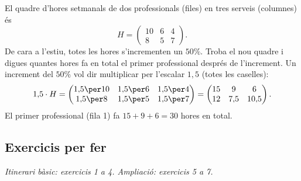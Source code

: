 \begin{exresolt}
El quadre d'hores setmanals de dos professionals (files) en tres serveis
(columnes) és
\[
H=\begin{pmatrix} 10 & 6 & 4 \\ 8 & 5 & 7 \end{pmatrix}.
\]
De cara a l'estiu, totes les hores s'incrementen un $50\%$. Troba el nou quadre
i digues quantes hores fa en total el primer professional després de l'increment.
\solucio
Un increment del $50\%$ vol dir multiplicar per l'escalar $1{,}5$ (totes les
caselles):
\[
1{,}5\cdot H=\begin{pmatrix} 1{,}5\per 10 & 1{,}5\per 6 & 1{,}5\per 4 \\ 1{,}5\per 8 & 1{,}5\per 5 & 1{,}5\per 7 \end{pmatrix}
            =\begin{pmatrix} 15 & 9 & 6 \\ 12 & 7{,}5 & 10{,}5 \end{pmatrix}.
\]
El primer professional (fila 1) fa $15+9+6=30$ hores en total.
\end{exresolt}

\subsection{Exercicis per fer}

\textit{Itinerari bàsic: exercicis 1 a 4. Ampliació: exercicis 5 a 7.}

